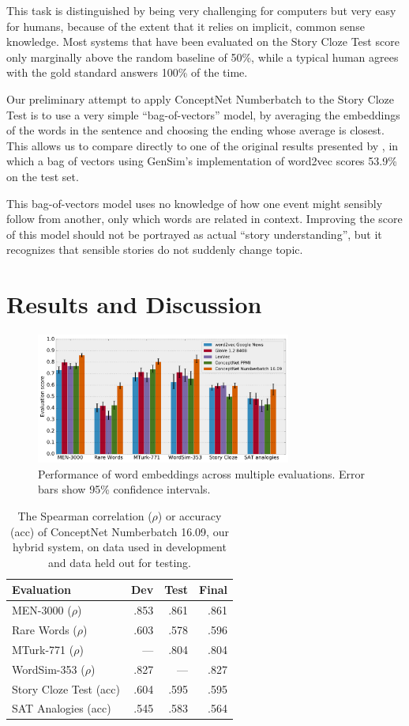 \documentclass[letterpaper]{article}
\begin{document}
This task is distinguished by being very challenging for computers but very
easy for humans, because of the extent that it relies on implicit, common sense
knowledge. Most systems that have been evaluated on the Story Cloze Test
score only marginally above the random baseline of 50\%, while a typical
human agrees with the gold standard answers 100\% of the time.

Our preliminary attempt to apply ConceptNet Numberbatch to the Story Cloze Test
is to use a very simple ``bag-of-vectors'' model, by averaging the
embeddings of the words in the sentence and choosing the ending whose average is
closest. This allows us to compare directly to one of the original results presented by
\citeauthor{mostafazadeh2016cloze}, in which a bag of vectors using GenSim's
implementation of word2vec scores 53.9\% on the test set.

This bag-of-vectors model uses no knowledge of how one event might sensibly
follow from another, only which words are related in context. Improving the
score of this model should not be portrayed as actual ``story understanding'',
but it recognizes that sensible stories do not suddenly change topic.

\section{Results and Discussion}
\begin{figure}[t]
\centering
\includegraphics[width=3.3in]{eval-graph.pdf}
\caption{
    Performance of word embeddings across multiple evaluations.
    Error bars show 95\% confidence intervals.
}
\label{eval-results}
\end{figure}

\begin{table}[t]
\centering
\begin{tabular}{lrrr}
\bf Evaluation     & \bf Dev & \bf Test & \bf Final \\
\hline
MEN-3000 ($\rho$)              & .853 & .861 & .861 \\
Rare Words ($\rho$)            & .603 & .578 & .596 \\
MTurk-771 ($\rho$)             &  --- & .804 & .804 \\
WordSim-353 ($\rho$)           & .827 &  --- & .827 \\
Story Cloze Test (acc)         & .604 & .595 & .595 \\
SAT Analogies (acc)            & .545 & .583 & .564
\end{tabular}
\caption{The Spearman correlation ($\rho$) or accuracy (acc) of ConceptNet Numberbatch 16.09, our hybrid system,
on data used in development and data held out for testing.}
\label{eval-table}
\end{table}
\end{document}
